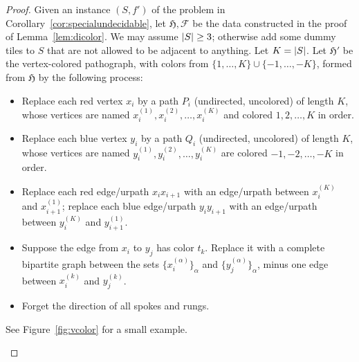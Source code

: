 \documentclass{article}
\newcommand{\cvert}[3]{\node[cdot={#3}] (#1) at (#2) {};}
\newcommand{\dicoledge}[3]{\draw[->, shorten >=4pt, color=#3] (#1) -- (#2);}
\newcommand{\Fc}{\mathcal{F}}
\newcommand{\Hf}{\mathfrak{H}}
\DeclarePairedDelimiter{\abs}{\lvert}{\rvert}
\begin{document}
\begin{proof}
Given an instance $(S, f')$ of the problem in Corollary~\ref{cor:specialundecidable}, let $\Hf,\Fc$ be the data constructed in the proof of Lemma~\ref{lem:dicolor}. We may assume $\abs{S}\ge 3$; otherwise add some dummy tiles to $S$ that are not allowed to be adjacent to anything. Let $K=\abs{S}$. Let $\Hf'$ be the vertex-colored pathograph, with colors from $\{1,\dots,K\}\cup\{-1,\dots,-K\}$, formed from $\Hf$ by the following process:
\begin{itemize}
    \item Replace each red vertex $x_i$ by a path $P_i$ (undirected, uncolored) of length $K$, whose vertices are named $x_i^{(1)},x_i^{(2)},\dots,x_i^{(K)}$ and colored $1,2,\dots,K$ in order.
    \item Replace each blue vertex $y_i$ by a path $Q_i$ (undirected, uncolored) of length $K$, whose vertices are named $y_i^{(1)},y_i^{(2)},\dots,y_i^{(K)}$ are colored $-1,-2,\dots,-K$ in order.
    \item Replace each red edge/urpath $x_ix_{i+1}$ with an edge/urpath between $x_i^{(K)}$ and $x_{i+1}^{(1)}$; replace each blue edge/urpath $y_iy_{i+1}$ with an edge/urpath between $y_i^{(K)}$ and $y_{i+1}^{(1)}$.
    \item Suppose the edge from $x_i$ to $y_j$ has color $t_k$. Replace it with a complete bipartite graph between the sets $\{x_i^{(\alpha)}\}_\alpha$ and $\{y_j^{(\alpha)}\}_\alpha$, minus one edge between $x_i^{(k)}$ and $y_j^{(k)}$.
    \item Forget the direction of all spokes and rungs.
\end{itemize}
See Figure~\ref{fig:vcolor} for a small example.

\begin{figure}[htbp!]
    \centering
\end{figure}
\end{proof}
\end{document}
